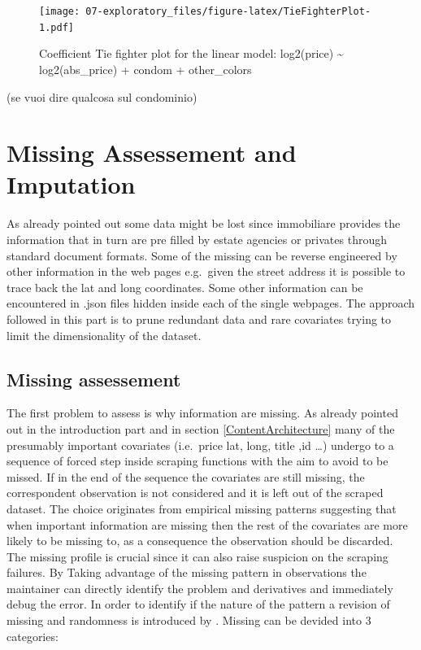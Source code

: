 \documentclass[
  12pt,
  a4paper,
  oneside]{book}
\theoremstyle{definition}
\theoremstyle{definition}
\theoremstyle{definition}
\theoremstyle{remark}
\begin{document}
\begin{figure}
\centering
\texttt{[image: 07-exploratory\_files/figure-latex/TieFighterPlot-1.pdf]}
\caption{\label{fig:TieFighterPlot}Coefficient Tie fighter plot for the linear model: log2(price) \textasciitilde{} log2(abs\_price) + condom + other\_colors}
\end{figure}

(se vuoi dire qualcosa sul condominio)

\hypertarget{missing-assessement-and-imputation}{%
\section{Missing Assessement and Imputation}\label{missing-assessement-and-imputation}}

As already pointed out some data might be lost since immobiliare provides the information that in turn are pre filled by estate agencies or privates through standard document formats. Some of the missing can be reverse engineered by other information in the web pages e.g.~given the street address it is possible to trace back the lat and long coordinates. Some other information can be encountered in .json files hidden inside each of the single webpages.
The approach followed in this part is to prune redundant data and rare covariates trying to limit the dimensionality of the dataset.

\hypertarget{missing-assessement}{%
\subsection{Missing assessement}\label{missing-assessement}}

The first problem to assess is why information are missing. As already pointed out in the introduction part and in section \ref{ContentArchitecture} many of the presumably important covariates (i.e.~price lat, long, title ,id \ldots) undergo to a sequence of forced step inside scraping functions with the aim to avoid to be missed. If in the end of the sequence the covariates are still missing, the correspondent observation is not considered and it is left out of the scraped dataset. The choice originates from empirical missing patterns suggesting that when important information are missing then the rest of the covariates are more likely to be missing to, as a consequence the observation should be discarded.
The missing profile is crucial since it can also raise suspicion on the scraping failures. By Taking advantage of the missing pattern in observations the maintainer can directly identify the problem and derivatives and immediately debug the error. In order to identify if the nature of the pattern a revision of missing and randomness is introduced by \citet{Little}.
Missing can be devided into 3 categories:
\end{document}
